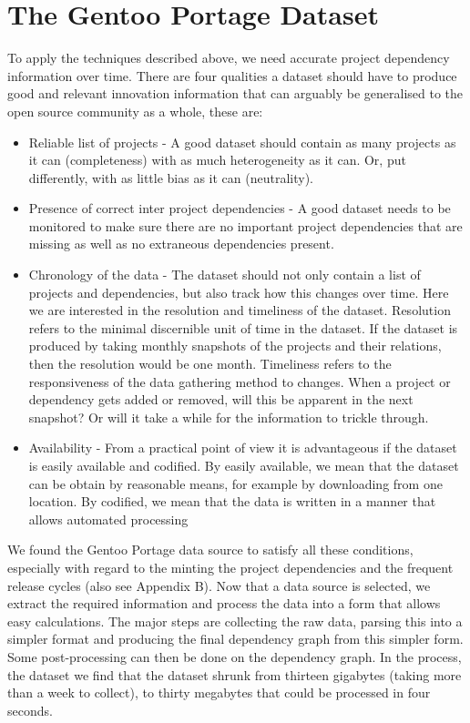 \documentclass[smallextended,final]{svjour3}
\begin{document}
\section{The Gentoo Portage Dataset}
To apply the techniques described above, we need accurate project dependency information over time. There are four qualities a dataset should have to produce good and relevant innovation information that can arguably be generalised to the open source community as a whole, these are:

\begin{itemize}

\item Reliable list of projects - A good dataset should contain as many projects as it can (completeness) with as much heterogeneity as it can. Or, put differently, with as little bias as it can (neutrality).

\item Presence of correct inter project dependencies - A good dataset needs to be monitored to make sure there are no important project dependencies that are missing as well as no extraneous dependencies present.

\item Chronology of the data - The dataset should not only contain a list of projects and dependencies, but also track how this changes over time. Here we are interested in the resolution and timeliness of the dataset. Resolution refers to the minimal discernible unit of time in the dataset. If the dataset is produced by taking monthly snapshots of the projects and their relations, then the resolution would be one month. Timeliness refers to the responsiveness of the data gathering method to changes. When a project or dependency gets added or removed, will this be apparent in the next snapshot? Or will it take a while for the information to trickle through.

\item Availability - From a practical point of view it is advantageous if the dataset is easily available and codified.  By easily available, we mean that the dataset can be obtain by reasonable means, for example by downloading from one location. By codified, we mean that the data is written in a manner that allows automated processing

\end{itemize}

We found the Gentoo Portage data source to satisfy all these conditions, especially with regard to the minting the project dependencies and the frequent release cycles (also see Appendix B).
Now that a data source is selected, we extract the required information and process the data into a form that allows easy calculations. The major steps are collecting the raw data, parsing this into a simpler format and producing the final dependency graph from this simpler form. Some post-processing can then be done on the dependency graph. In the process, the dataset we find that the dataset shrunk from thirteen gigabytes (taking more than a week to collect), to thirty megabytes that could be processed in four seconds.
\end{document}
